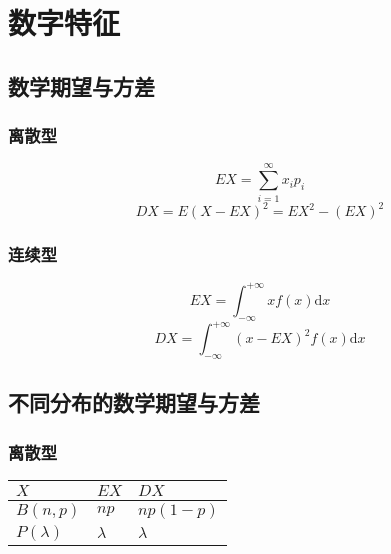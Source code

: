 

\section{数字特征}

\subsection{数学期望与方差}

\subsubsection{离散型}


\begin{equation*}
  EX=\sum\limits_{i=1}^{\infty} x_{i} p_{i}
\end{equation*}
\begin{equation*}
  DX=E(X-EX)^{2}=EX^{2}-(EX)^{2}
\end{equation*}

\subsubsection{连续型}
\begin{equation*}
  EX=\int_{-\infty}^{+\infty} x f(x) \mathrm{d} x
\end{equation*}
\begin{equation*}
  DX=\int_{-\infty}^{+\infty} (x-EX)^{2} f(x) \mathrm{d} x
\end{equation*}



\subsection{不同分布的数学期望与方差}

\subsubsection{离散型}


\begin{table}[H]
  \renewcommand\arraystretch{1.5}
  \begin{tabular}{|l|l|l|}
    \hline
    $X$&$EX$&$DX$\\
    \hline
    $B(n,p)$&$np$&$np(1-p)$\\
    \hline
    $P(\lambda)$&$\lambda$&$\lambda$\\
    \hline
  \end{tabular}
\end{table}

